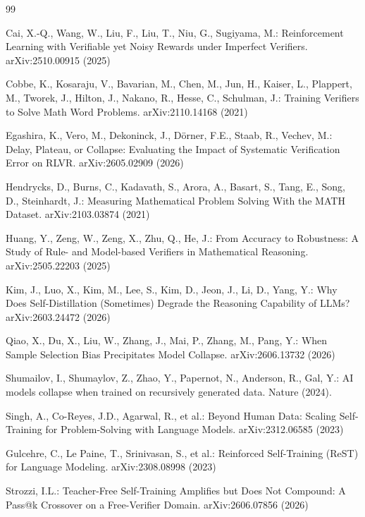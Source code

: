 \documentclass[runningheads]{llncs}
\begin{document}
\begin{thebibliography}{99}

Cai, X.-Q., Wang, W., Liu, F., Liu, T., Niu, G., Sugiyama, M.:
Reinforcement Learning with Verifiable yet Noisy Rewards under Imperfect
Verifiers. arXiv:2510.00915 (2025)

Cobbe, K., Kosaraju, V., Bavarian, M., Chen, M., Jun, H., Kaiser, L.,
Plappert, M., Tworek, J., Hilton, J., Nakano, R., Hesse, C., Schulman, J.:
Training Verifiers to Solve Math Word Problems. arXiv:2110.14168 (2021)

Egashira, K., Vero, M., Dekoninck, J., D\"orner, F.E., Staab, R., Vechev,
M.: Delay, Plateau, or Collapse: Evaluating the Impact of Systematic
Verification Error on RLVR. arXiv:2605.02909 (2026)

Hendrycks, D., Burns, C., Kadavath, S., Arora, A., Basart, S., Tang, E.,
Song, D., Steinhardt, J.: Measuring Mathematical Problem Solving With the
MATH Dataset. arXiv:2103.03874 (2021)

Huang, Y., Zeng, W., Zeng, X., Zhu, Q., He, J.: From Accuracy to
Robustness: A Study of Rule- and Model-based Verifiers in Mathematical
Reasoning. arXiv:2505.22203 (2025)

Kim, J., Luo, X., Kim, M., Lee, S., Kim, D., Jeon, J., Li, D., Yang, Y.:
Why Does Self-Distillation (Sometimes) Degrade the Reasoning Capability of
LLMs? arXiv:2603.24472 (2026)

Qiao, X., Du, X., Liu, W., Zhang, J., Mai, P., Zhang, M., Pang, Y.:
When Sample Selection Bias Precipitates Model Collapse. arXiv:2606.13732
(2026)

Shumailov, I., Shumaylov, Z., Zhao, Y., Papernot, N., Anderson, R., Gal,
Y.: AI models collapse when trained on recursively generated data. Nature
(2024). 

Singh, A., Co-Reyes, J.D., Agarwal, R., et al.: Beyond Human Data: Scaling
Self-Training for Problem-Solving with Language Models. arXiv:2312.06585
(2023)

Gulcehre, C., Le Paine, T., Srinivasan, S., et al.: Reinforced
Self-Training (ReST) for Language Modeling. arXiv:2308.08998 (2023)

Strozzi, I.L.: Teacher-Free Self-Training Amplifies but Does Not Compound:
A Pass@k Crossover on a Free-Verifier Domain. arXiv:2606.07856 (2026)


\end{thebibliography}
\end{document}
